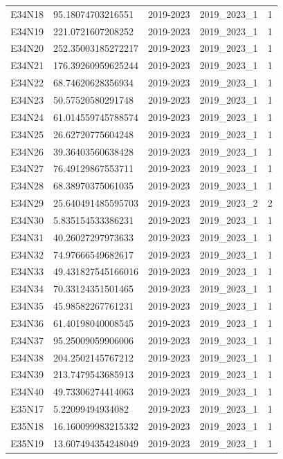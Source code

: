 \begin{landscape}
\begin{longtable}{lllll}
E34N18 & 95.18074703216551 & 2019-2023 & 2019\_2023\_1 & 1 \\
E34N19 & 221.0721607208252 & 2019-2023 & 2019\_2023\_1 & 1 \\
E34N20 & 252.35003185272217 & 2019-2023 & 2019\_2023\_1 & 1 \\
E34N21 & 176.39260959625244 & 2019-2023 & 2019\_2023\_1 & 1 \\
E34N22 & 68.74620628356934 & 2019-2023 & 2019\_2023\_1 & 1 \\
E34N23 & 50.57520580291748 & 2019-2023 & 2019\_2023\_1 & 1 \\
E34N24 & 61.014559745788574 & 2019-2023 & 2019\_2023\_1 & 1 \\
E34N25 & 26.62720775604248 & 2019-2023 & 2019\_2023\_1 & 1 \\
E34N26 & 39.36403560638428 & 2019-2023 & 2019\_2023\_1 & 1 \\
E34N27 & 76.49129867553711 & 2019-2023 & 2019\_2023\_1 & 1 \\
E34N28 & 68.38970375061035 & 2019-2023 & 2019\_2023\_1 & 1 \\
E34N29 & 25.640491485595703 & 2019-2023 & 2019\_2023\_2 & 2 \\
E34N30 & 5.835154533386231 & 2019-2023 & 2019\_2023\_1 & 1 \\
E34N31 & 40.26027297973633 & 2019-2023 & 2019\_2023\_1 & 1 \\
E34N32 & 74.97666549682617 & 2019-2023 & 2019\_2023\_1 & 1 \\
E34N33 & 49.431827545166016 & 2019-2023 & 2019\_2023\_1 & 1 \\
E34N34 & 70.33124351501465 & 2019-2023 & 2019\_2023\_1 & 1 \\
E34N35 & 45.98582267761231 & 2019-2023 & 2019\_2023\_1 & 1 \\
E34N36 & 61.40198040008545 & 2019-2023 & 2019\_2023\_1 & 1 \\
E34N37 & 95.25009059906006 & 2019-2023 & 2019\_2023\_1 & 1 \\
E34N38 & 204.2502145767212 & 2019-2023 & 2019\_2023\_1 & 1 \\
E34N39 & 213.7479543685913 & 2019-2023 & 2019\_2023\_1 & 1 \\
E34N40 & 49.73306274414063 & 2019-2023 & 2019\_2023\_1 & 1 \\
E35N17 & 5.22099494934082 & 2019-2023 & 2019\_2023\_1 & 1 \\
E35N18 & 16.160099983215332 & 2019-2023 & 2019\_2023\_1 & 1 \\
E35N19 & 13.607494354248049 & 2019-2023 & 2019\_2023\_1 & 1 \\

\end{longtable}
\end{landscape}
